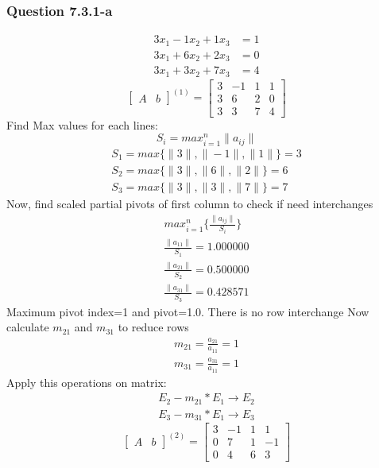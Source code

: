 \documentclass{article}
\begin{document}
\subsubsection{Question 7.3.1-a}
\begin{align}
\label{q7.3.1.a.1}3x_{1}-1x_{2}+1x_{3}&=1 \\
\label{q7.3.1.a.2}3x_{1}+6x_{2}+2x_{3}&=0 \\
\label{q7.3.1.a.3}3x_{1}+3x_{2}+7x_{3}&=4
\end{align}
\[
\left[
\begin{array}{c|c}
A&b
\end{array}
\right]^{(1)}
=
\left[
\begin{array}{ccc|c}
	3&-1&1&1\\
	3&6&2&0\\
	3&3&7&4 
\end{array}
\right]
\]
Find Max values for each lines: 
\begin{equation}
\label{findSMax2}S_{i}=max_{i=1}^n\|a_{ij}\|
\end{equation}
\begin{align}
	S_{1}=max\{\|3\|,\|-1\|,\|1\|\}=3\\
	S_{2}=max\{\|3\|,\|6\|,\|2\|\}=6\\
	S_{3}=max\{\|3\|,\|3\|,\|7\|\}=7
\end{align}
Now, find scaled partial pivots of first column to check if need interchanges
\begin{align}
	max_{i=1}^n\{\frac{\|a_{ij}\|}{S_{i}}\}\\
	\frac{\|a_{11}\|}{S_{1}}=1.000000\\
	\frac{\|a_{21}\|}{S_{2}}=0.500000\\
	\frac{\|a_{31}\|}{S_{3}}=0.428571
\end{align}
Maximum pivot index=1 and pivot=1.0. There is no row interchange
Now calculate $m_{21}$ and $m_{31}$ to reduce rows 
\begin{align}
	m_{21}=\frac{a_{21}}{a_{11}}=1\\
	m_{31}=\frac{a_{31}}{a_{11}}=1
\end{align}
Apply this operations on matrix:
\begin{align}
	E_{2}-m_{21}*E_{1}\rightarrow E_{2}\\
	E_{3}-m_{31}*E_{1}\rightarrow E_{3}
\end{align}
\[
\left[
\begin{array}{c|c}
A&b
\end{array}
\right]^{(2)}
=
\left[
\begin{array}{ccc|c}
	3&-1&1&1\\
	0&7&1&-1\\
	0&4&6&3 
\end{array}
\right]
\]
\end{document}
